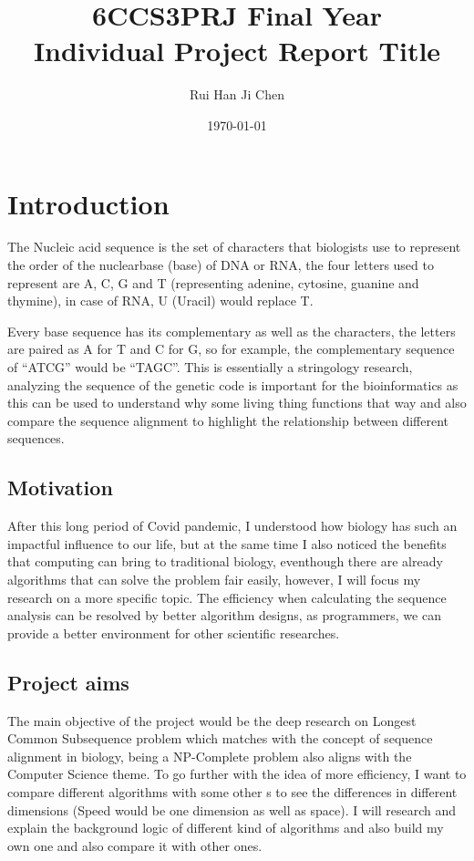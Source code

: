\documentclass[11pt]{informatics-report}
\title{6CCS3PRJ Final Year\\\vspace{0.2cm}Individual Project Report Title}
\author{Rui Han Ji Chen}
\date{\today}
\begin{document}
\createFrontMatter
\onehalfspacing
\tableofcontents
\doublespacing


\chapter{Introduction}


The Nucleic acid sequence is the set of characters that biologists use to represent the order of the nuclearbase (base) 
of DNA or RNA, the four letters used to represent are A, C, G and T (representing adenine, cytosine, guanine and 
thymine), in case of RNA, U (Uracil) would replace T. 

Every base sequence has its complementary as well as the characters, the letters are paired as A for T and C for G, so 
for example, the complementary sequence of ``ATCG'' would be ``TAGC''. This is essentially a stringology research, 
analyzing the sequence of the genetic code is important for the bioinformatics as this can be used to understand why
some living thing functions that way and also compare the sequence alignment to highlight the relationship between
different sequences. 
 
\section{Motivation}

After this long period of Covid pandemic, I understood how biology has such an impactful influence to our life, but at 
the same time I also noticed the benefits that computing can bring to traditional biology, eventhough there are already
algorithms that can solve the problem fair easily, however, I will focus my research on a more specific topic. The 
efficiency when calculating the sequence analysis can be resolved by better algorithm designs, as programmers, we 
can provide a better environment for other scientific researches. 

\section{Project aims}

The main objective of the project would be the deep research on Longest Common Subsequence problem which matches with
the concept of sequence alignment in biology, being a NP-Complete problem also aligns with the Computer Science theme. 
To go further with the idea of more efficiency, I want to compare different algorithms with some other s to see the 
differences in different dimensions (Speed would be one dimension as well as space). I will research and explain
the background logic of different kind of algorithms and also build my own one and also compare it with other ones.
\end{document}
